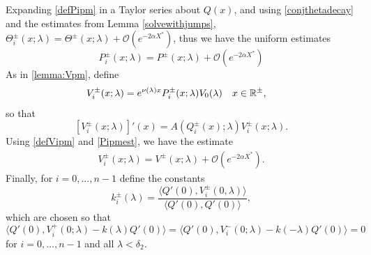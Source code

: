 \documentclass[10pt,reqno]{amsart}
\theoremstyle{plain}
\theoremstyle{definition}
\theoremstyle{remark}
\numberwithin{theorem}{section}
\numberwithin{equation}{section}
\begin{document}
Expanding \cref{defPipm} in a Taylor series about $Q(x)$, and using \cref{conjthetadecay} and the estimates from Lemma \ref{solvewithjumps}, $\Theta_i^\pm(x; \lambda) = \Theta^\pm(x; \lambda) + \mathcal{O}(e^{-2 \alpha X^*})$, thus we have the uniform estimates
\begin{equation}\label{Pipmest}
P_i^\pm(x; \lambda) = P^\pm(x; \lambda) + \mathcal{O}(e^{-2 \alpha X^*})
\end{equation}
As in \cref{lemma:Vpm}, define
\begin{align}\label{defVipm}
V_i^\pm(x; \lambda) &= e^{\nu(\lambda)x} P_i^\pm(x; \lambda)V_0(\lambda) && x \in \mathbb{R}^\pm,
\end{align}
so that
\begin{equation}\label{PDEeigcenter}
[V_i^\pm(x; \lambda)]'(x) = A(Q_i^\pm(x); \lambda) V_i^\pm(x; \lambda).
\end{equation}
Using \cref{defVipm} and \cref{Pipmest}, we have the estimate
\begin{align}\label{Vipmest}
V_i^\pm(x; \lambda) = V^\pm(x; \lambda) + \mathcal{O}(e^{-2 \alpha X^*}).
\end{align}
Finally, for $i = 0, \dots, n-1$ define the constants
\begin{equation}\label{defklambda}
k_i^\pm(\lambda) = \frac{\langle Q'(0), V_i^\pm(0, \lambda) \rangle}{\langle Q'(0), Q'(0) \rangle},
\end{equation}
which are chosen so that
\begin{equation}\label{klambdaIP}
\langle Q'(0), V_i^+(0; \lambda) - k(\lambda)Q'(0) \rangle = 
\langle Q'(0), V_i^-(0; \lambda) - k(-\lambda)Q'(0) \rangle = 0
\end{equation}
for $i = 0, \dots, n-1$ and all $\lambda < \delta_2$. 
\end{document}
